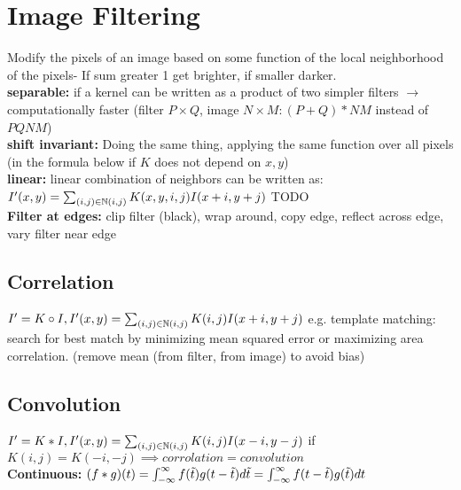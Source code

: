 \section*{Image Filtering}
Modify the pixels of an image based on some function of the local neighborhood of the pixels- If sum greater 1 get brighter, if smaller darker.\\
\textbf{separable:} if a kernel can be written as a product of two simpler filters $\rightarrow$ computationally faster (filter $P \times Q$, image $N \times M: (P + Q) * NM$ instead of $PQNM$)\\
\textbf{shift invariant:} Doing the same thing, applying the same function over all pixels (in the formula below if $K$ does not depend on $x, y$)\\
\textbf{linear:} linear combination of neighbors can be written as: $I'(x, y) = \sum_{(i, j) \in \mathbb{N}(i, j)} K(x, y, i, j) I (x + i, y + j)$ TODO\\
\textbf{Filter at edges:} clip filter (black), wrap around, copy edge, reflect across edge, vary filter near edge\\
\subsection*{Correlation}
$I' = K \circ I, I'(x, y) = \sum_{(i, j) \in \mathbb{N}(i, j)} K(i, j) I (x + i, y + j)$ e.g. template matching: search for best match by minimizing mean squared error or maximizing area correlation. (remove mean (from filter, from image) to avoid bias)\\
\subsection*{Convolution}
$I' = K * I, I'(x, y) = \sum_{(i, j) \in \mathbb{N}(i, j)} K(i, j) I (x - i, y - j)$ if $K(i, j) = K (-i, -j) \implies corrolation = convolution$\\
\textbf{Continuous:} $(f * g)(t) \\
= \int_{-\infty}^{\infty} f(\tilde{t}) g(t - \tilde{t}) d\tilde{t}\\
= \int_{-\infty}^{\infty} f(t - \tilde{t}) g(\tilde{t}) dt$\\
